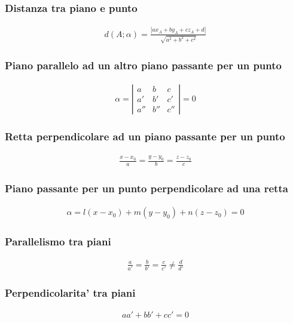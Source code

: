 \documentclass[a4paper]{article}
\begin{document}
	\subsubsection{Distanza tra piano e punto}
	\begin{align*}
		d(A ; \alpha) = \frac{|ax_A + by_A + cz_A + d|}{\sqrt{a^2+b^2+c^2}}
	\end{align*}
	
	\subsubsection{Piano parallelo ad un altro piano passante per un punto}
	
	\begin{align*}
	\alpha = \left|
		\begin{array}{ccc}
			a & b & c \\ 
			a' & b' & c' \\ 
			a'' & b'' & c''
		\end{array}
		\right| = 0 
	\end{align*}
		
	\subsubsection{Retta perpendicolare ad un piano passante per un punto}
	
	\begin{align*}
		\frac{x-x_0}{a} = \frac{y-y_0}{b} = \frac{z-z_0}{c}
	\end{align*}
	
	\subsubsection{Piano passante per un punto perpendicolare ad una retta}
	
	\begin{align*}
		\alpha = l(x-x_0)+m(y-y_0)+n(z-z_0)=0
	\end{align*}
	
	\subsubsection{Parallelismo tra piani}
	\begin{align*}
		\frac{a}{a'} = \frac{b}{b'} = \frac{c}{c'} \ne \frac{d}{d'}
	\end{align*}
	
	\subsubsection{Perpendicolarita' tra piani}
	\begin{align*}
		aa'+bb'+cc'=0
	\end{align*}
	
\end{document}
